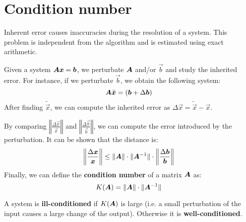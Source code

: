\section{Condition number}
Inherent error causes inaccuracies during the resolution of a system.
This problem is independent from the algorithm and is estimated using exact arithmetic.

Given a system ${\bm{A}}{\bm{x}} = {\bm{b}}$, we perturbate ${\bm{A}}$ and/or $\vec{b}$ and study the inherited error.
For instance, if we perturbate $\vec{b}$, we obtain the following system:
\[ {\bm{A}}\tilde{{\bm{x}}} = ({\bm{b}} + \Delta{\bm{b}}) \]
After finding $\tilde{\vec{x}}$, we can compute the inherited error as $\Delta\vec{x} = \tilde{\vec{x}} - \vec{x}$.

By comparing $\left\Vert \frac{\Delta\vec{x}}{\vec{x}} \right\Vert$ and $\left\Vert \frac{\Delta\vec{b}}{\vec{b}} \right\Vert$, 
we can compute the error introduced by the perturbation.
It can be shown that the distance is:
\[ 
    \left\Vert \frac{\Delta{\bm{x}}}{{\bm{x}}} \right\Vert \leq 
    \Vert {\bm{A}} \Vert \cdot \Vert {\bm{A}}^{-1} \Vert \cdot \left\Vert \frac{\Delta{\bm{b}}}{{\bm{b}}} \right\Vert 
\]
Finally, we can define the \textbf{condition number} of a matrix ${\bm{A}}$ as: 
\[ K({\bm{A}}) = \Vert {\bm{A}} \Vert \cdot \Vert {\bm{A}}^{-1} \Vert \]

A system is \textbf{ill-conditioned} if $K({\bm{A}})$ is large 
(i.e. a small perturbation of the input causes a large change of the output).
Otherwise it is \textbf{well-conditioned}. 